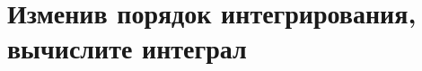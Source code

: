 \documentclass[a4paper, fleqn]{article}
\begin{document}
    
    
    \section*{Изменив порядок интегрирования, вычислите интеграл}
    
\end{document}
